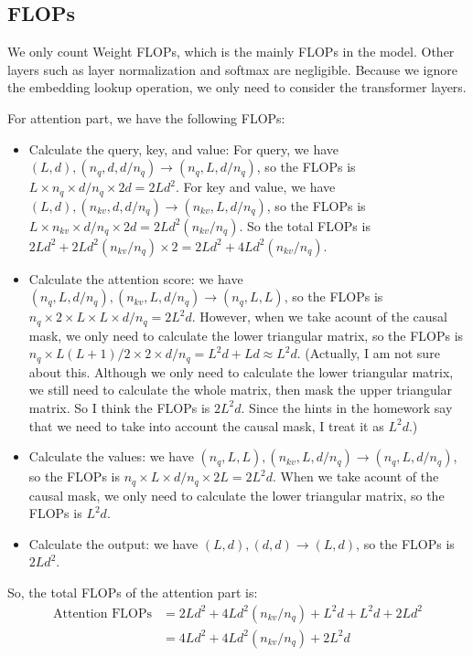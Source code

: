 \documentclass[a4paper,12pt]{article}
\begin{document}
\subsection{FLOPs}

We only count Weight FLOPs, which is the mainly FLOPs in the model. Other layers such as layer normalization and softmax are negligible. Because we ignore the embedding lookup operation, we only need to consider the transformer layers.

For attention part, we have the following FLOPs:

\begin{itemize}
    \item Calculate the query, key, and value: For query, we have $(L,d),(n_q,d,d/n_q) \to (n_q,L,d/n_q)$, so the FLOPs is $L \times n_q \times d/n_q \times 2d = 2Ld^2$. For key and value, we have $(L,d),(n_{kv},d,d/n_q) \to (n_{kv},L,d/n_q)$, so the FLOPs is $L \times n_{kv} \times d/n_q \times 2d = 2Ld^2(n_{kv}/n_q)$. So the total FLOPs is $2Ld^2 + 2Ld^2(n_{kv}/n_q) \times 2 = 2Ld^2 + 4Ld^2(n_{kv}/n_q)$.

    \item Calculate the attention score: we have $(n_q,L,d/n_q),(n_{kv},L,d/n_q) \to (n_q,L,L)$, so the FLOPs is $n_q \times 2 \times L \times L \times d/n_q = 2L^2d$. However, when we take acount of the causal mask, we only need to calculate the lower triangular matrix, so the FLOPs is $n_q \times L(L+1)/2 \times 2 \times d/n_q = L^2d + Ld \approx L^2d$. (Actually, I am not sure about this. Although we only need to calculate the lower triangular matrix, we still need to calculate the whole matrix, then mask the upper triangular matrix. So I think the FLOPs is $2L^2d$. Since the hints in the homework say that we need to take into account the causal mask, I treat it as $L^2d$.)

    \item Calculate the values: we have $(n_q,L,L),(n_{kv},L,d/n_q) \to (n_q,L,d/n_q)$, so the FLOPs is $n_q \times L \times  d/n_q \times 2L = 2L^2d$. When we take acount of the causal mask, we only need to calculate the lower triangular matrix, so the FLOPs is $L^2d$.

    \item Calculate the output: we have $(L,d),(d,d) \to (L,d)$, so the FLOPs is $2Ld^2$.

\end{itemize}

So, the total FLOPs of the attention part is:
\begin{align}
    \text{Attention FLOPs} &= 2Ld^2 + 4Ld^2(n_{kv}/n_q) + L^2d + L^2d + 2Ld^2 \\
    &= 4Ld^2 + 4Ld^2(n_{kv}/n_q) + 2L^2d
\end{align}
\end{document}
